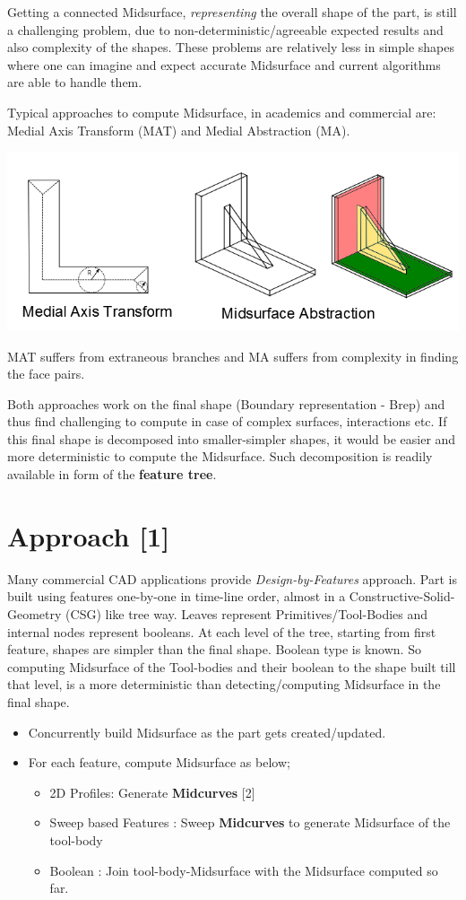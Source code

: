 Getting a connected Midsurface, {\em representing} the overall shape of the part, is still a challenging problem, due to non-deterministic/agreeable expected results and also complexity of the shapes. These problems are relatively less in simple shapes where one can imagine and expect accurate Midsurface and current algorithms are able to handle them. 

Typical approaches to compute Midsurface, in academics and commercial are:  Medial Axis Transform (MAT) and Medial Abstraction (MA).

\includegraphics[width=0.8\linewidth]{../Common/images/MAT_Midsurf.png}

MAT suffers from extraneous branches and MA suffers from complexity in finding the face pairs.

Both approaches work on the final shape (Boundary representation - Brep) and thus find challenging to compute in case of complex surfaces, interactions etc. If this final shape is decomposed into smaller-simpler shapes, it would be easier and more deterministic to compute the Midsurface. Such decomposition is readily available in form of the \textbf{feature tree}.

\section{Approach [1]}
Many commercial CAD applications provide {\em Design-by-Features} approach. Part is built using features one-by-one in time-line order, almost in a Constructive-Solid-Geometry (CSG) like tree way. Leaves represent  Primitives/Tool-Bodies and internal nodes represent booleans. At each level of the tree, starting from first feature, shapes are simpler than the final shape. Boolean type is known. So computing Midsurface of the Tool-bodies and their boolean to the shape built till that level, is a more deterministic than detecting/computing Midsurface in the final shape.

\begin{itemize}[noitemsep,nolistsep]
\item Concurrently build Midsurface as the part gets created/updated. 
\item For each feature, compute Midsurface as below;
	\begin{itemize}[noitemsep,nolistsep]
	\item 2D Profiles: Generate \textbf{Midcurves} [2]
	\item Sweep based Features : Sweep \textbf{Midcurves} to generate Midsurface of the tool-body
	\item Boolean : Join tool-body-Midsurface with the Midsurface computed so far.
	\end{itemize}
\end{itemize}

